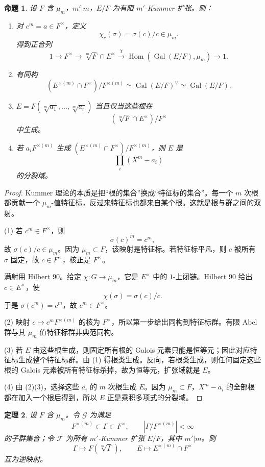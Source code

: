 \documentclass[11pt,a4paper,openany]{ctexbook}
\numberwithin{equation}{chapter}
\theoremstyle{plain}
\newtheorem{theorem}{定理}[chapter]
\newtheorem{proposition}[theorem]{命题}
\theoremstyle{definition}
\theoremstyle{remark}
\begin{document}
\begin{proposition}
设 $F$ 含 $\mu_m$，$m'|m$，$E/F$ 为有限 $m'$-Kummer 扩张。则：
\begin{enumerate}[label=(\arabic*)]
\item 对 $c^m=a\in F^\times$，定义
\[
 \chi_c(\sigma)=\sigma(c)/c\in\mu_m.
\]
得到正合列
\[
 1\to F^\times\to \sqrt[m]{F}\cap E^\times
 \xrightarrow{\chi}\operatorname{Hom}(\operatorname{Gal}(E/F),\mu_m)\to1.
\]
\item 有同构
\[
 (E^{\times(m)}\cap F^\times)/F^{\times(m)}
 \simeq \operatorname{Gal}(E/F)^\vee
 \simeq \operatorname{Gal}(E/F).
\]
\item $E=F(\sqrt[m]{a_1},\ldots,\sqrt[m]{a_r})$ 当且仅当这些根在
\[
 (\sqrt[m]{F}\cap E^\times)/F^\times
\]
中生成。
\item 若 $a_iF^{\times(m)}$ 生成 $(E^{\times(m)}\cap F^\times)/F^{\times(m)}$，则 $E$ 是
\[
 \prod_i(X^m-a_i)
\]
的分裂域。
\end{enumerate}
\end{proposition}

\begin{proof}
Kummer 理论的本质是把“根的集合”换成“特征标的集合”。每一个 $m$ 次根都贡献一个
$\mu_m$-值特征标，反过来特征标也都来自某个根。这就是根与群之间的双射。

(1) 若 $c^m\in F^\times$，则
\[
 \sigma(c)^m=c^m,
\]
故 $\sigma(c)/c\in\mu_m$。因为 $\mu_m\subset F$，该映射是特征标。若特征标平凡，则 $c$ 被所有 $\sigma$ 固定，故 $c\in F^\times$，核正是 $F^\times$。

满射用 Hilbert 90。给定 $\chi:G\to\mu_m$，它是 $E^\times$ 中的 $1$-上闭链。Hilbert 90 给出 $c\in E^\times$，使
\[
 \chi(\sigma)=\sigma(c)/c.
\]
于是 $\sigma(c^m)=c^m$，故 $c^m\in F^\times$。

(2) 映射 $c\mapsto c^mF^{\times(m)}$ 的核为 $F^\times$，所以第一步给出同构到特征标群。有限 Abel 群与其 $\mu_m$-值特征标群非典范同构。

(3) 若 $E$ 由这些根生成，则固定所有根的 Galois 元素只能是恒等元；因此对应特征标生成整个特征标群。由 (1) 得根类生成。反向，若根类生成，则任何固定这些根的 Galois 元素被所有特征标杀掉，故为恒等元，扩张域就是 $E$。

(4) 由 (2)(3)，选择这些 $a_i$ 的 $m$ 次根生成 $E$。因为 $\mu_m\subset F$，$X^m-a_i$ 的全部根都在加入一个根后得到，所以 $E$ 正是乘积多项式的分裂域。
\end{proof}

\begin{theorem}
设 $F$ 含 $\mu_m$。令 $\mathcal G$ 为满足
\[
 F^{\times(m)}\subset\Gamma\subset F^\times,\qquad
 |\Gamma/F^{\times(m)}|<\infty
\]
的子群集合；令 $\mathcal F$ 为所有 $m'$-Kummer 扩张 $E/F$，其中 $m'|m$。则
\[
 \Gamma\mapsto F(\sqrt[m]{\Gamma}),
\qquad
 E\mapsto E^{\times(m)}\cap F^\times
\]
互为逆映射。
\end{theorem}
\end{document}
